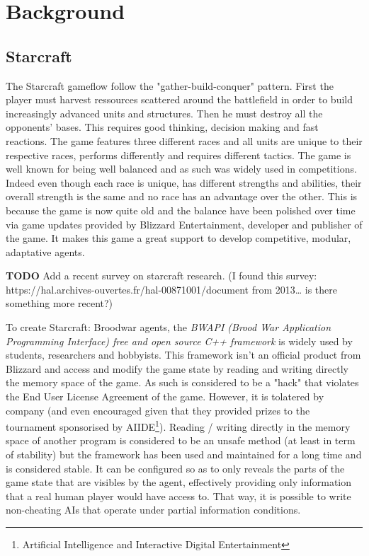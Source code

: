 \section{Background}\label{section:background}

\subsection{Starcraft}

The Starcraft gameflow follow the "gather-build-conquer" pattern. First the player must harvest ressources
scattered around the battlefield in order to build increasingly advanced units and structures.
Then he must destroy all the opponents' bases. This requires good thinking, decision making and fast reactions.
The game features three different races and all units are unique to their respective races,
performs differently and requires different tactics.
The game is well known for being well balanced and as such was widely used in competitions.
Indeed even though each race is unique, has different strengths and abilities, their overall strength
is the same and no race has an advantage over the other. This is because the game is now quite old
and the balance have been polished over time via game updates provided by Blizzard Entertainment,
developer and publisher of the game. It makes this game a great support to develop competitive, modular,
adaptative agents.

{\bf TODO} Add a recent survey on starcraft research.
(I found this survey: https://hal.archives-ouvertes.fr/hal-00871001/document from 2013… is there something more recent?)

To create Starcraft: Broodwar agents, the \emph{BWAPI (Brood War
Application Programming Interface)
free and open source C++ framework} is widely used by students,
researchers and hobbyists. This framework isn't an
official product from Blizzard and access and modify the game state
by reading and writing directly the memory space of
the game. As such is considered to be a "hack" that violates the
End User License Agreement of the game. However, it
is tolatered by company (and even encouraged given that they provided
prizes to the tournament sponsorised by AIIDE\footnote{Artificial Intelligence
and Interactive Digital Entertainment}). Reading / writing directly
in the memory space of another program is
considered to be an unsafe method (at least in term of stability) but
the framework has been used and maintained for a long time and is considered stable.
It can be configured so as to only reveals the parts of
the game state that are visibles by the agent, effectively providing only information
that a real human player would have access to. That way, it is possible to write
non-cheating AIs that operate under partial information conditions.

